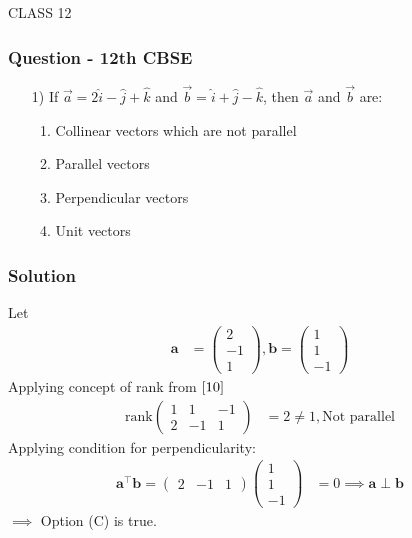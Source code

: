 \documentclass{beamer}
\begin{document}
\begin{frame}[standout]
    CLASS 12
\end{frame}








\begin{frame}
\frametitle{Question - 12th CBSE}
\begin{enumerate}
    \item [1)]
If $\overrightarrow{a} = 2\hat{i} - \hat{j} + \hat{k}$ and  $\overrightarrow{b} = \hat{i} + \hat{j} - \hat{k}$, then $\overrightarrow{a}$ and $\overrightarrow{b}$ are:
    \begin{enumerate}
\item Collinear vectors which are not parallel
\item Parallel vectors
\item Perpendicular vectors
\item Unit vectors
\end{enumerate}
\end{enumerate}
    
\end{frame}





\begin{frame}
\frametitle{Solution}
Let
\begin{align}
    \textbf{a} &= \begin{pmatrix}
        2\\
        -1\\
        1
    \end{pmatrix} , 
    \textbf{b}=\begin{pmatrix}
        1\\
        1\\
        -1
    \end{pmatrix}
    \end{align}
    Applying concept of rank from $\eqref{10}$
    \begin{align}
                  \text{rank}\begin{pmatrix}
        1 & 1 & -1\\
        2 & -1 & 1
    \end{pmatrix} &=2 \neq 1 ,
    \text{Not parallel}
    \end{align}
    Applying condition for perpendicularity:
    \begin{align}
            \textbf{a}^{\top}\textbf{b} = \begin{pmatrix}
        2 &-1 &1
    \end{pmatrix}\begin{pmatrix}
        1\\
        1\\
        -1
    \end{pmatrix} &= 0
    \implies \textbf{a} \perp \textbf{b}
\end{align}
$\implies$ Option (C) is true.
    
\end{frame}
\end{document}
